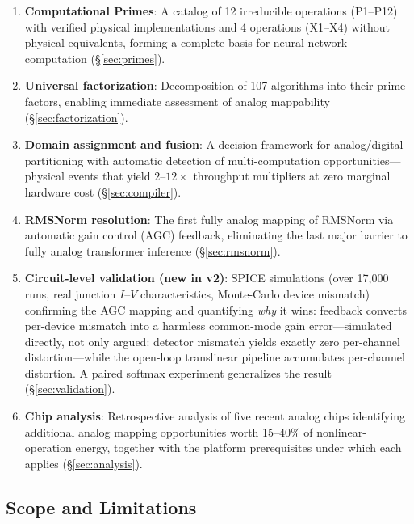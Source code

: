 \documentclass[11pt]{article}
\begin{document}
\begin{enumerate}[leftmargin=*]
\item \textbf{Computational Primes}: A catalog of 12 irreducible operations (P1--P12) with verified physical implementations and 4 operations (X1--X4) without physical equivalents, forming a complete basis for neural network computation (\S\ref{sec:primes}).

\item \textbf{Universal factorization}: Decomposition of 107 algorithms into their prime factors, enabling immediate assessment of analog mappability (\S\ref{sec:factorization}).

\item \textbf{Domain assignment and fusion}: A decision framework for analog/digital partitioning with automatic detection of multi-computation opportunities---physical events that yield $2$--$12\times$ throughput multipliers at zero marginal hardware cost (\S\ref{sec:compiler}).

\item \textbf{RMSNorm resolution}: The first fully analog mapping of RMSNorm via automatic gain control (AGC) feedback, eliminating the last major barrier to fully analog transformer inference (\S\ref{sec:rmsnorm}).

\item \textbf{Circuit-level validation (new in v2)}: SPICE simulations (over 17{,}000 runs, real junction $I$--$V$ characteristics, Monte-Carlo device mismatch) confirming the AGC mapping and quantifying \textit{why} it wins: feedback converts per-device mismatch into a harmless common-mode gain error---simulated directly, not only argued: detector mismatch yields exactly zero per-channel distortion---while the open-loop translinear pipeline accumulates per-channel distortion. A paired softmax experiment generalizes the result (\S\ref{sec:validation}).

\item \textbf{Chip analysis}: Retrospective analysis of five recent analog chips identifying additional analog mapping opportunities worth 15--40\% of nonlinear-operation energy, together with the platform prerequisites under which each applies (\S\ref{sec:analysis}).
\end{enumerate}

\subsection{Scope and Limitations}
\end{document}
